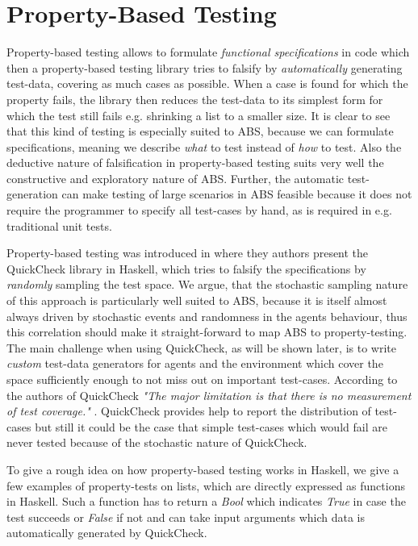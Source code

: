 \section{Property-Based Testing}
\label{sec:proptesting}

Property-based testing allows to formulate \textit{functional specifications} in code which then a property-based testing library tries to falsify by \textit{automatically} generating test-data, covering as much cases as possible. When a case is found for which the property fails, the library then reduces the test-data to its simplest form for which the test still fails e.g. shrinking a list to a smaller size. It is clear to see that this kind of testing is especially suited to ABS, because we can formulate specifications, meaning we describe \textit{what} to test instead of \textit{how} to test. Also the deductive nature of falsification in property-based testing suits very well the constructive and exploratory nature of ABS. Further, the automatic test-generation can make testing of large scenarios in ABS feasible because it does not require the programmer to specify all test-cases by hand, as is required in e.g. traditional unit tests.

Property-based testing was introduced in \cite{claessen_quickcheck_2000,claessen_testing_2002} where they authors present the QuickCheck library in Haskell, which tries to falsify the specifications by \textit{randomly} sampling the test space. We argue, that the stochastic sampling nature of this approach is particularly well suited to ABS, because it is itself almost always driven by stochastic events and randomness in the agents behaviour, thus this correlation should make it straight-forward to map ABS to property-testing. The main challenge when using QuickCheck, as will be shown later, is to write \textit{custom} test-data generators for agents and the environment which cover the space sufficiently enough to not miss out on important test-cases. According to the authors of QuickCheck \textit{"The major limitation is that there is no measurement of test coverage."} \cite{claessen_quickcheck_2000}. QuickCheck provides help to report the distribution of test-cases but still it could be the case that simple test-cases which would fail are never tested because of the stochastic nature of QuickCheck.

To give a rough idea on how property-based testing works in Haskell, we give a few examples of property-tests on lists, which are directly expressed as functions in Haskell. Such a function has to return a \textit{Bool} which indicates \textit{True} in case the test succeeds or \textit{False} if not and can take input arguments which data is automatically generated by QuickCheck. %

